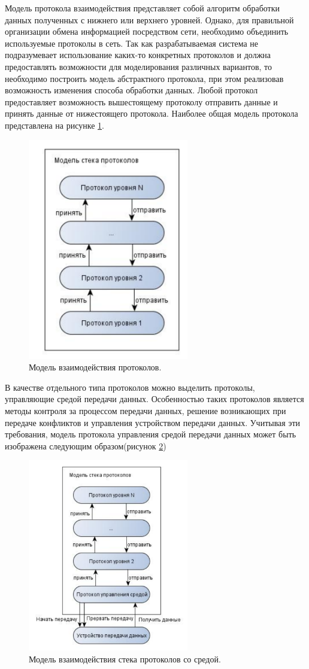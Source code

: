 \documentclass[12pt]{report}
\begin{document}
    Модель протокола взаимодействия представляет собой алгоритм обработки данных полученных с нижнего или верхнего уровней. Однако, для правильной организации обмена информацией посредством сети, необходимо объединить используемые протоколы в сеть. Так как разрабатываемая система не подразумевает использование каких-то конкретных протоколов и должна предоставлять возможности для моделирования различных вариантов, то необходимо построить модель абстрактного протокола, при этом реализовав возможность изменения способа обработки данных. Любой протокол предоставляет возможность вышестоящему протоколу отправить данные и принять данные от нижестоящего протокола. Наиболее общая модель протокола представлена на рисунке \ref{Pic6}.
    \begin{figure}\center
        \includegraphics[width = 70mm]{Ch2Pic6}
        \caption{Модель взаимодействия протоколов.} \label{Pic6}
    \end{figure}
    В качестве отдельного типа протоколов можно выделить протоколы, управляющие средой передачи данных. Особенностью таких протоколов является методы контроля за процессом передачи данных, решение возникающих при передаче конфликтов и управления устройством передачи данных. Учитывая эти требования, модель протокола управления средой передачи данных может быть изображена следующим образом(рисунок \ref{Pic7})
    \begin{figure}\center
        \includegraphics[width = 70mm]{Ch2Pic7}
        \caption{Модель взаимодействия стека протоколов со средой.} \label{Pic7}
    \end{figure}
\end{document}
